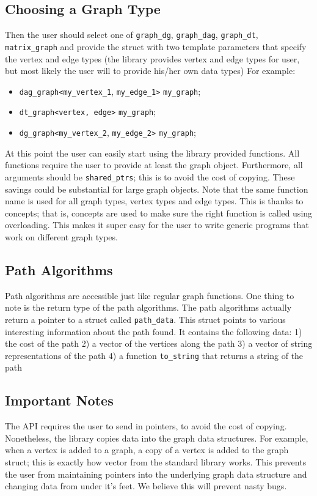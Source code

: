 \documentclass{article}
\begin{document}
\subsection{Choosing a Graph Type}
Then the user should select one of \texttt{graph\_dg}, \texttt{graph\_dag}, \texttt{graph\_dt}, \texttt{matrix\_graph} and provide the struct with two template parameters that specify the vertex and edge types (the library provides vertex and edge types for user, but most likely the user will to provide his/her own data types) 
For example: 
\begin{itemize}
\item \texttt{dag\_graph<}\texttt{my\_vertex\_1}, \texttt{my\_edge\_1>} \texttt{my\_graph}; 
\item \texttt{dt\_graph<vertex, edge>} \texttt{my\_graph}; 
\item \texttt{dg\_graph<}\texttt{my\_vertex\_2}, \texttt{my\_edge\_2>} \texttt{my\_graph};
\end{itemize}
 At this point the user can easily start using the library provided functions. All functions require the user to provide at least the graph object. Furthermore, all arguments should be \texttt{shared\_ptrs}; this is to avoid the cost of copying. These savings could be substantial for large graph objects.
Note that the same function name is used for all graph types, vertex types and edge types. This is thanks to concepts; that is, concepts are used to make sure the right function is called using overloading. This makes it super easy for the user to write generic programs that work on different graph types. 
\subsection{Path Algorithms}
Path algorithms are accessible just like regular graph functions. One thing to note is the return type of the path algorithms. The path algorithms actually return a pointer to a struct called \texttt{path\_data}. This struct points to various interesting information about the path found. It contains the following data: 1) the cost of the path 2) a vector of the vertices along the path 3) a vector of string representations of the path 4) a function \texttt{to\_string} that returns a string of the path

\subsection{Important Notes}
The API requires the user to send in pointers, to avoid the cost of copying. Nonetheless, the library copies data into the graph data structures. For example, when a vertex is added to a graph, a copy of a vertex is added to the graph struct; this is exactly how vector from the standard library works. This prevents the user from maintaining pointers into the underlying graph data structure and changing data from under it's feet. We believe this will prevent nasty bugs.
\end{document}
